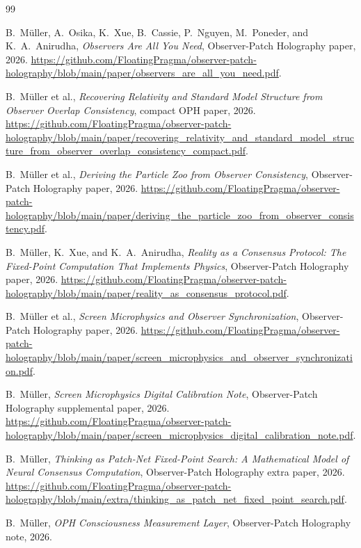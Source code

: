 \documentclass[11pt]{article}
\theoremstyle{remark}
\theoremstyle{plain}
\begin{document}
\begin{thebibliography}{99}

B.\ M\"uller, A.\ Osika, K.\ Xue, B.\ Cassie, P.\ Nguyen, M.\ Poneder, and K.\ A.\ Anirudha,
\emph{Observers Are All You Need},
Observer-Patch Holography paper, 2026.
\url{https://github.com/FloatingPragma/observer-patch-holography/blob/main/paper/observers_are_all_you_need.pdf}.

B.\ M\"uller et al.,
\emph{Recovering Relativity and Standard Model Structure from Observer Overlap Consistency},
compact OPH paper, 2026.
\url{https://github.com/FloatingPragma/observer-patch-holography/blob/main/paper/recovering_relativity_and_standard_model_structure_from_observer_overlap_consistency_compact.pdf}.

B.\ M\"uller et al.,
\emph{Deriving the Particle Zoo from Observer Consistency},
Observer-Patch Holography paper, 2026.
\url{https://github.com/FloatingPragma/observer-patch-holography/blob/main/paper/deriving_the_particle_zoo_from_observer_consistency.pdf}.

B.\ M\"uller, K.\ Xue, and K.\ A.\ Anirudha,
\emph{Reality as a Consensus Protocol: The Fixed-Point Computation That Implements Physics},
Observer-Patch Holography paper, 2026.
\url{https://github.com/FloatingPragma/observer-patch-holography/blob/main/paper/reality_as_consensus_protocol.pdf}.

B.\ M\"uller et al.,
\emph{Screen Microphysics and Observer Synchronization},
Observer-Patch Holography paper, 2026.
\url{https://github.com/FloatingPragma/observer-patch-holography/blob/main/paper/screen_microphysics_and_observer_synchronization.pdf}.

B.\ M\"uller,
\emph{Screen Microphysics Digital Calibration Note},
Observer-Patch Holography supplemental paper, 2026.
\url{https://github.com/FloatingPragma/observer-patch-holography/blob/main/paper/screen_microphysics_digital_calibration_note.pdf}.

B.\ M\"uller,
\emph{Thinking as Patch-Net Fixed-Point Search: A Mathematical Model of Neural Consensus Computation},
Observer-Patch Holography extra paper, 2026.
\url{https://github.com/FloatingPragma/observer-patch-holography/blob/main/extra/thinking_as_patch_net_fixed_point_search.pdf}.

B.\ M\"uller,
\emph{OPH Consciousness Measurement Layer},
Observer-Patch Holography note, 2026.


\end{thebibliography}
\end{document}
